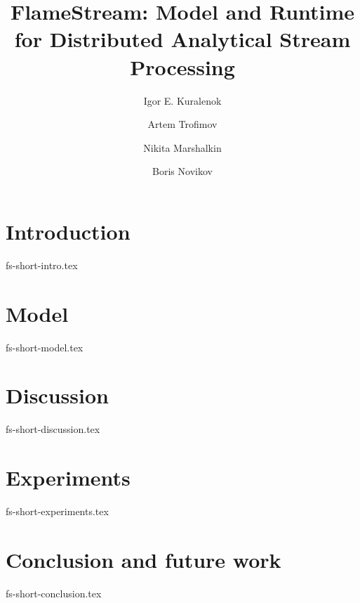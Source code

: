 \documentclass[sigconf]{acmart}
\theoremstyle{remark}
\newcommand {\FlameStream} {FlameStream}
\begin{document}
\title {\FlameStream: Model and Runtime for Distributed Analytical Stream Processing}

\author{Igor E. Kuralenok}

\author{Artem Trofimov}

\author{Nikita Marshalkin}

\author{Boris Novikov}

\begin{abstract}

\end {abstract}

\maketitle

\section {Introduction}
 {fs-short-intro.tex}

\section {Model}
 {fs-short-model.tex}

\section {Discussion}
 {fs-short-discussion.tex}

\section {Experiments}
 {fs-short-experiments.tex}

\section {Conclusion and future work}
 {fs-short-conclusion.tex}



\end{document}
